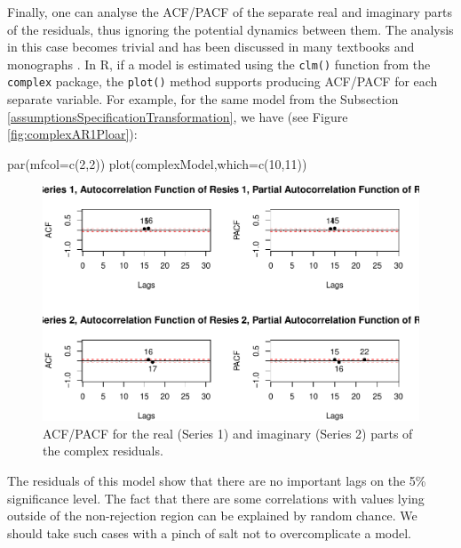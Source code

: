 \documentclass[
]{book}
\newenvironment{Shaded}{\begin{snugshade}}{\end{snugshade}}
\newcommand{\AttributeTok}[1]{\textcolor[rgb]{0.77,0.63,0.00}{#1}}
\newcommand{\DecValTok}[1]{\textcolor[rgb]{0.00,0.00,0.81}{#1}}
\newcommand{\FunctionTok}[1]{\textcolor[rgb]{0.00,0.00,0.00}{#1}}
\newcommand{\NormalTok}[1]{#1}
\begin{document}
Finally, one can analyse the ACF/PACF of the separate real and imaginary parts of the residuals, thus ignoring the potential dynamics between them. The analysis in this case becomes trivial and has been discussed in many textbooks and monographs \citep[for example, see][]{SvetunkovAdam}. In R, if a model is estimated using the \texttt{clm()} function from the \texttt{complex} package, the \texttt{plot()} method supports producing ACF/PACF for each separate variable. For example, for the same model from the Subsection \ref{assumptionsSpecificationTransformation}, we have (see Figure \ref{fig:complexAR1Ploar}):

\begin{Shaded}
\begin{Highlighting}[]
\FunctionTok{par}\NormalTok{(}\AttributeTok{mfcol=}\FunctionTok{c}\NormalTok{(}\DecValTok{2}\NormalTok{,}\DecValTok{2}\NormalTok{))}
\FunctionTok{plot}\NormalTok{(complexModel,}\AttributeTok{which=}\FunctionTok{c}\NormalTok{(}\DecValTok{10}\NormalTok{,}\DecValTok{11}\NormalTok{))}
\end{Highlighting}
\end{Shaded}

\begin{figure}
\centering
\includegraphics{Svetunkov---Svetunkov---Complex-Valued-Econometrics_files/figure-latex/complexARDiagnosticsACFPACF-1.pdf}
\caption{\label{fig:complexARDiagnosticsACFPACF}ACF/PACF for the real (Series 1) and imaginary (Series 2) parts of the complex residuals.}
\end{figure}

The residuals of this model show that there are no important lags on the 5\% significance level. The fact that there are some correlations with values lying outside of the non-rejection region can be explained by random chance. We should take such cases with a pinch of salt not to overcomplicate a model.
\end{document}
